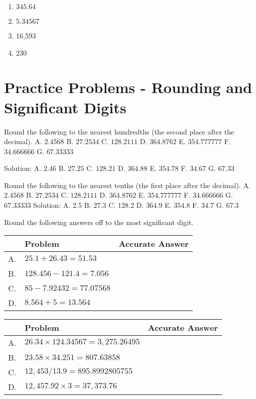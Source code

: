 \documentclass[10pt]{article}
\begin{document}
\begin{enumerate}
\begin{enumerate}
\begin{enumerate}
  \item $345.64$

  \item $5.34567$

  \item 16,593

  \item 230

\end{enumerate}

\section{Practice Problems - Rounding and Significant Digits}
Round the following to the nearest hundredths (the second place after the decimal).
A. $2.4568$
B. $27.2534$
C. $128.2111$
D. $364.8762$
E. $354.777777$
F. $34.666666$
G. $67.33333$

Solution:
A. $2.46$
B. $27.25$
C. $128.21$
D. $364.88$
E. $354.78$
F. $34.67$
G. $67.33$

Round the following to the nearest tenths (the first place after the decimal).
A. $2.4568$
B. $27.2534$
C. $128.2111$
D. $364.8762$
E. $354.777777$
F. $34.666666$
G. $67.33333$ Solution:
A. $2.5$
B. $27.3$
C. $128.2$
D. $364.9$
E. $354.8$
F. $34.7$
G. $67.3$

Round the following answers off to the most significant digit.

\begin{center}
\begin{tabular}{|l|l|l|}
\hline
 & Problem & Accurate Answer \\
\hline
A. & $25.1+26.43=51.53$ &  \\
\hline
B. & $128.456-121.4=7.056$ &  \\
\hline
C. & $85-7.92432=77.07568$ &  \\
\hline
D. & $8.564+5=13.564$ &  \\
\hline
\end{tabular}
\end{center}

\begin{center}
\begin{tabular}{|l|l|l|}
\hline
 & Problem & Accurate Answer \\
\hline
A. & $26.34 \times 124.34567=3,275.26495$ &  \\
\hline
B. & $23.58 \times 34.251=807.63858$ &  \\
\hline
C. & $12,453 / 13.9=895.8992805755$ &  \\
\hline
D. & $12,457.92 \times 3=37,373.76$ &  \\
\hline
\end{tabular}
\end{center}


\end{enumerate}
\end{enumerate}
\end{document}

